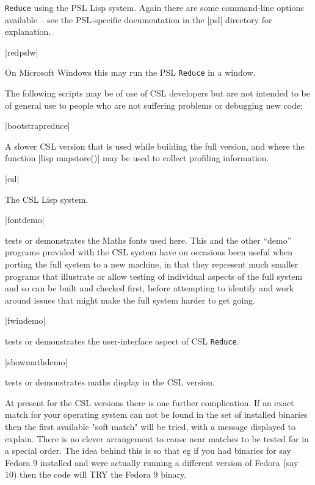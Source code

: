 \documentclass[12pt,twoside,openright]{memoir}
\newcommand{\reduce}{\texttt{Reduce}\xspace}
\begin{document}
\begin{description}
\begin{description}
    \reduce using the PSL Lisp system. Again there are some command-line
options available -- see the PSL-specific documentation in the |psl|
directory for explanation.
  \item |redpslw|

    On Microsoft Windows this may run the PSL \reduce in a window.
  \end{description}
The following scripts may be of use of CSL developers but are not intended to be
of general use to people who are not suffering problems or debugging new code:
\begin{description}
\item |bootstrapreduce|

  A slower CSL version that is used while building the
  full version, and where the function |lisp mapstore()| may be used to collect
  profiling information.

\item |csl|

  The CSL Lisp system.
\item |fontdemo|

 tests or demonstrates the Maths fonts used here.  This and the other
``demo'' programs provided with the CSL system have on occasions been
useful when porting the full system to a new machine, in that they represent
much smaller programs that illustrate or allow testing of individual aspects
of the full system and so can be built and checked first, before attempting
to identify and work around issues that might make the full system harder
to get going.

\item |fwindemo|

  tests or demonstrates the user-interface aspect of CSL \reduce.

\item |showmathdemo|

  tests or demonstrates maths display in the CSL version.
\end{description}
At present for the CSL versions there is one further complication. If an
exact match for your operating system can not be found in the set of installed
binaries then the first available "soft match" will be tried, with a message
displayed to explain. There is no clever arrangement to cause near matches
to be tested for in a special order. The idea behind this is so that eg if
you had binaries for say Fedora 9 installed and were actually running a
different version of Fedora (say 10) then the code will TRY the Fedora 9
binary. 


\end{description}
\end{document}

